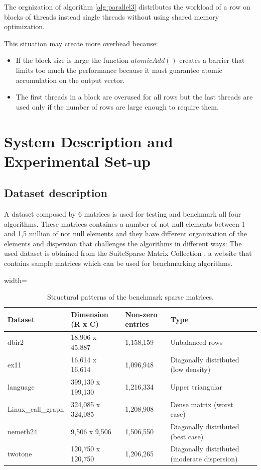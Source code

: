 \documentclass[conference]{IEEEtran}
\begin{document}
The orgnization of algorithm \ref{alg:parallel3} distributes the workload of a row on blocks of threads instead single threads without using shared memory optimization. 

This situation may create more overhead because:
\begin{itemize}
    \item If the block size is large the function $atomicAdd()$ creates a barrier that limits too much the performance because it must guarantee atomic accumulation on the output vector. 
    \item The first threads in a block are overused for all rows but the last threads are used only if the number of rows are large enough to require them. 
\end{itemize}

\section{System Description and Experimental Set-up}
\subsection{Dataset description}
A dataset composed by 6 matrices is used for testing and benchmark all four algorithms. These matrices containes a number of not null elements between 1 and 1,5 million of not null elements and they have different organization of the elements and dispersion that challenges the algorithms in different ways:
The used dataset is obtained from the SuiteSparse Matrix Collection \cite{suitesparse}, a website that contains sample matrices which can be used for benchmarking algorithms. 

\begin{table}[h]
    \centering
    \begin{adjustbox}{width=\columnwidth}
    \begin{tabular}{llllrl}
    \toprule
    \textbf{Dataset} & \textbf{Dimension (R x C)} & \textbf{Non-zero entries} & \textbf{Type} \\
    \midrule
    dbir2 \cite{dbir2} & 18,906 x 45,887 & 1,158,159 & Unbalanced rows \\
    ex11 \cite{ex11} & 16,614 x 16,614 & 1,096,948  & Diagonally distributed (low density) \\
    language \cite{language} & 399,130 x 199,130 & 1,216,334 & Upper triangular \\
    Linux\_call\_graph \cite{linuxcallgraph} & 324,085 x 324,085 & 1,208,908 & Dense matrix (worst case) \\
    nemeth24 \cite{nemeth24} & 9,506 x 9,506 & 1,506,550 & Diagonally distributed (best case) \\
    twotone \cite{twotone} & 120,750 x 120,750 & 1,206,265 & Diagonally distributed (moderate dispersion) \\
    \bottomrule
    \end{tabular}
    \end{adjustbox}
    \vspace{1em}
    \caption{Structural patterns of the benchmark sparse matrices.}
    \label{tab:my_label}
\end{table}
\end{document}
